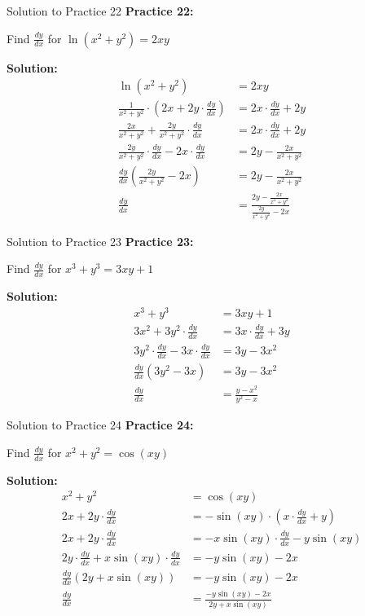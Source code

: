 \documentclass[aspectratio=169]{beamer}
\begin{document}
\begin{frame}{Solution to Practice 22}
\textbf{Practice 22:}

Find $\frac{dy}{dx}$ for $\ln(x^2 + y^2) = 2xy$

\textbf{Solution:}
\[
\begin{aligned}
  \ln(x^2 + y^2) &= 2xy \\
  \frac{1}{x^2 + y^2} \cdot (2x + 2y \cdot \frac{dy}{dx}) &= 2x \cdot \frac{dy}{dx} + 2y \\
  \frac{2x}{x^2 + y^2} + \frac{2y}{x^2 + y^2} \cdot \frac{dy}{dx} &= 2x \cdot \frac{dy}{dx} + 2y \\
  \frac{2y}{x^2 + y^2} \cdot \frac{dy}{dx} - 2x \cdot \frac{dy}{dx} &= 2y - \frac{2x}{x^2 + y^2} \\
  \frac{dy}{dx}(\frac{2y}{x^2 + y^2} - 2x) &= 2y - \frac{2x}{x^2 + y^2} \\
  \frac{dy}{dx} &= \frac{2y - \frac{2x}{x^2 + y^2}}{\frac{2y}{x^2 + y^2} - 2x}
\end{aligned}
\]
\end{frame}

\begin{frame}{Solution to Practice 23}
\textbf{Practice 23:}

Find $\frac{dy}{dx}$ for $x^3 + y^3 = 3xy + 1$

\textbf{Solution:}
\[
\begin{aligned}
  x^3 + y^3 &= 3xy + 1 \\
  3x^2 + 3y^2 \cdot \frac{dy}{dx} &= 3x \cdot \frac{dy}{dx} + 3y \\
  3y^2 \cdot \frac{dy}{dx} - 3x \cdot \frac{dy}{dx} &= 3y - 3x^2 \\
  \frac{dy}{dx}(3y^2 - 3x) &= 3y - 3x^2 \\
  \frac{dy}{dx} &= \frac{y - x^2}{y^2 - x}
\end{aligned}
\]
\end{frame}

\begin{frame}{Solution to Practice 24}
\textbf{Practice 24:}

Find $\frac{dy}{dx}$ for $x^2 + y^2 = \cos(xy)$

\textbf{Solution:}
\[
\begin{aligned}
  x^2 + y^2 &= \cos(xy) \\
  2x + 2y \cdot \frac{dy}{dx} &= -\sin(xy) \cdot (x \cdot \frac{dy}{dx} + y) \\
  2x + 2y \cdot \frac{dy}{dx} &= -x\sin(xy) \cdot \frac{dy}{dx} - y\sin(xy) \\
  2y \cdot \frac{dy}{dx} + x\sin(xy) \cdot \frac{dy}{dx} &= -y\sin(xy) - 2x \\
  \frac{dy}{dx}(2y + x\sin(xy)) &= -y\sin(xy) - 2x \\
  \frac{dy}{dx} &= \frac{-y\sin(xy) - 2x}{2y + x\sin(xy)}
\end{aligned}
\]
\end{frame}
\end{document}
